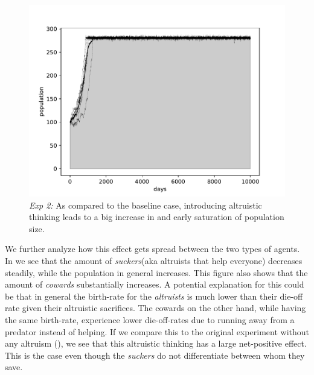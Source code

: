 \documentclass[sigconf]{acmart}
\newcommand{\todo}[1]{{\color{red}{#1}}}
\newcommand{\cowards}{\textit{cowards}\xspace}
\newcommand{\altruists}{\textit{altruists}\xspace}
\newcommand{\suckers}{\textit{suckers}\xspace}
\begin{document}
    \begin{figure}
        \includegraphics[width=\columnwidth]{figures/exp2_total}
        \caption{\textit{Exp 2:} As compared to the baseline case, introducing altruistic thinking leads to a big increase in and early saturation of population size.
        }
        \label{fig:exp2_total}
    \end{figure}

    We further analyze how this effect gets spread between the two types of agents.
    In  we see that the amount of \suckers (aka altruists that help everyone) decreases steadily, while the population in general increases.
    This figure also shows that the amount of \cowards substantially increases.
    A potential explanation for this could be that in general the birth-rate for the \altruists is much lower than their die-off rate given their altruistic sacrifices.
    The cowards on the other hand, while having the same birth-rate, experience lower die-off-rates due to running away from a predator instead of helping.
    If we compare this to the original experiment without any altruism (), we see that this altruistic thinking has a large net-positive effect.
    This is the case even though the \suckers do not differentiate between whom they save.
\end{document}
